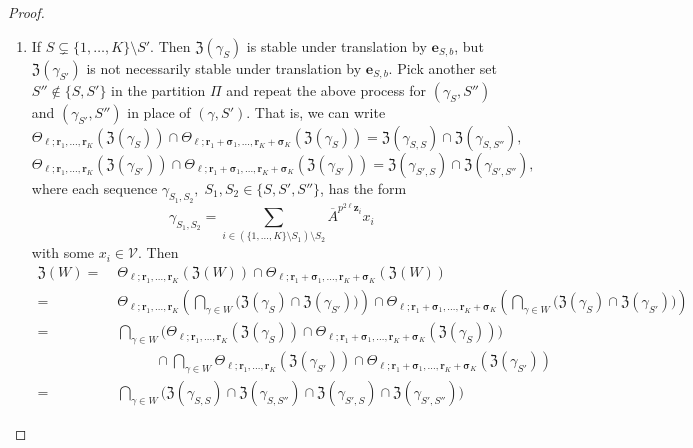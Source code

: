 \documentclass[letterpaper, 11pt, thm-restate]{article}
\numberwithin{equation}{section}
\newcommand{\mV}{\mathcal{V}}
\newcommand{\mZ}{\mathfrak{Z}}
\newcommand{\br}{\boldsymbol{r}}
\newcommand{\bz}{\boldsymbol{z}}
\newcommand{\bsig}{\boldsymbol{\sigma}}
\newcommand{\oA}{\overline{A}}
\theoremstyle{definition}
\theoremstyle{definition}
\theoremstyle{definition}
\begin{document}
\begin{proof}
\begin{enumerate}[nosep, wide, label=\textbf{Case~\arabic*:}]
    \item 
    If $S \subsetneq \{1, \ldots, K\} \setminus S'$.
    Then $\mZ(\gamma_S)$ is stable under translation by $\boldsymbol{e}_{S, b}$, but $\mZ(\gamma_{S'})$ is not necessarily stable under translation by $\boldsymbol{e}_{S, b}$.
    Pick another set $S'' \notin \{S, S'\}$ in the partition $\Pi$ and repeat the above process for $(\gamma_S, S'')$ and $(\gamma_{S'}, S'')$ in place of $(\gamma, S')$.
    That is, we can write
    \[
    \Theta_{\ell; \br_1, \ldots, \br_K}(\mZ(\gamma_{S})) \cap \Theta_{\ell; \br_1 + \bsig_1, \ldots, \br_K + \bsig_K}(\mZ(\gamma_{S})) = \mZ(\gamma_{S, S}) \cap \mZ(\gamma_{S, S''}),
    \]
    \[
    \Theta_{\ell; \br_1, \ldots, \br_K}(\mZ(\gamma_{S'})) \cap \Theta_{\ell; \br_1 + \bsig_1, \ldots, \br_K + \bsig_K}(\mZ(\gamma_{S'})) = \mZ(\gamma_{S', S}) \cap \mZ(\gamma_{S', S''}),
    \]
    where each sequence $\gamma_{S_1, S_2}, \; S_1, S_2 \in \{S, S', S''\}$, has the form 
    \[
    \gamma_{S_1, S_2} = \sum_{i \in (\{1, \ldots, K\} \setminus S_1)\setminus S_2} \oA^{p^{2\ell} \bz_{i}} x_i
    \]
    with some $x_i \in \mV$.
    Then
    \begin{align*}
        \mZ(W) = & \; \Theta_{\ell; \br_1, \ldots, \br_K}(\mZ(W)) \cap \Theta_{\ell; \br_1 + \bsig_1, \ldots, \br_K + \bsig_K}(\mZ(W)) \\
        = & \; \Theta_{\ell; \br_1, \ldots, \br_K}\left(\bigcap_{\gamma \in W} \big(\mZ(\gamma_S) \cap \mZ(\gamma_{S'}) \big)\right) \cap \Theta_{\ell; \br_1 + \bsig_1, \ldots, \br_K + \bsig_K}\left(\bigcap_{\gamma \in W} \big(\mZ(\gamma_S) \cap \mZ(\gamma_{S'}) \big)\right) \\
        = & \; \bigcap_{\gamma \in W} \big( \Theta_{\ell; \br_1, \ldots, \br_K}(\mZ(\gamma_{S})) \cap \Theta_{\ell; \br_1 + \bsig_1, \ldots, \br_K + \bsig_K}(\mZ(\gamma_{S})) \big) \\
        & \quad \quad \quad \cap \bigcap_{\gamma \in W} \Theta_{\ell; \br_1, \ldots, \br_K}(\mZ(\gamma_{S'})) \cap \Theta_{\ell; \br_1 + \bsig_1, \ldots, \br_K + \bsig_K}(\mZ(\gamma_{S'})) \\
        = & \; \bigcap_{\gamma \in W} \big(\mZ(\gamma_{S, S}) \cap \mZ(\gamma_{S, S''}) \cap \mZ(\gamma_{S', S}) \cap \mZ(\gamma_{S', S''}) \big)
    \end{align*}
    

\end{enumerate}
\end{proof}
\end{document}

